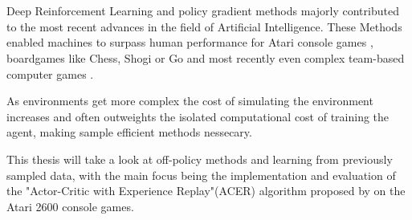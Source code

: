 \section*{}
Deep Reinforcement Learning and policy gradient methods majorly contributed to the most recent advances in the field of Artificial Intelligence.
These Methods enabled machines to surpass human performance for Atari console games \citep{mnih2015atari}, boardgames like Chess, Shogi \citep{Shogi17} or Go \citep{Go2017} and most recently even complex team-based computer games \citep{OpenAI_dota}.

As environments get more complex the cost of simulating the environment increases and often outweights the isolated computational cost of training the agent, making sample efficient methods nessecary.

This thesis will take a look at off-policy methods and learning from previously sampled data, with the main focus being the implementation and evaluation of the "Actor-Critic with Experience Replay"(ACER) algorithm proposed by \cite{ACER} on the Atari 2600 console games.
